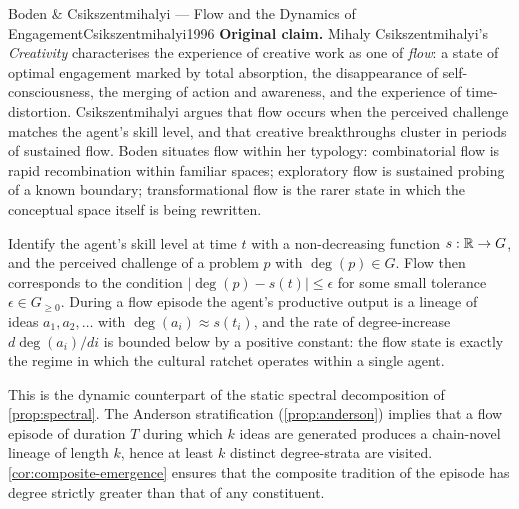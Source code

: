 \begin{zooentry}{Boden \& Csikszentmihalyi --- Flow and the Dynamics of Engagement}{Csikszentmihalyi1996}
\textbf{Original claim.} Mihaly Csikszentmihalyi's \emph{Creativity}
\cite{Csikszentmihalyi1996} characterises the experience of creative
work as one of \emph{flow}: a state of optimal engagement marked by
total absorption, the disappearance of self-consciousness, the merging
of action and awareness, and the experience of time-distortion.
Csikszentmihalyi argues that flow occurs when the perceived challenge
matches the agent's skill level, and that creative breakthroughs cluster
in periods of sustained flow. Boden \cite{Boden2004} situates flow within
her typology: combinatorial flow is rapid recombination within familiar
spaces; exploratory flow is sustained probing of a known boundary;
transformational flow is the rarer state in which the conceptual space
itself is being rewritten.

\formalclaim Identify the agent's skill level at time $t$ with a
non-decreasing function $s : \mathbb{R} \to G$, and the perceived challenge
of a problem $p$ with $\deg(p)\in G$. Flow then corresponds to the
condition $|\deg(p) - s(t)| \le \epsilon$ for some small tolerance
$\epsilon\in G_{\ge 0}$. During a flow episode the agent's productive
output is a lineage of ideas $a_1,a_2,\dots$ with
$\deg(a_i) \approx s(t_i)$, and the rate of degree-increase
$d\deg(a_i)/di$ is bounded below by a positive constant: the flow
state is exactly the regime in which the cultural ratchet
\cite{Henrich2015} operates within a single agent.

\formalstatus This is the dynamic counterpart of the static spectral
decomposition of \cref{prop:spectral}. The Anderson stratification
(\cref{prop:anderson}) implies that a flow episode of duration $T$
during which $k$ ideas are generated produces a chain-novel lineage of
length $k$, hence at least $k$ distinct degree-strata are visited.
\cref{cor:composite-emergence} ensures that the composite tradition
of the episode has degree strictly greater than that of any
constituent.


\end{zooentry}
